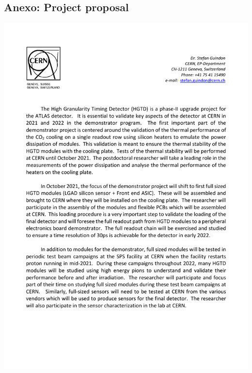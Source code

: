 \thispagestyle{plain}
\begin{appendices}
\chapter{Anexo: Project proposal}
\thispagestyle{plain}
\includegraphics[scale=0.8]{assets/SP_postdoc.pdf}
\end{appendices}
